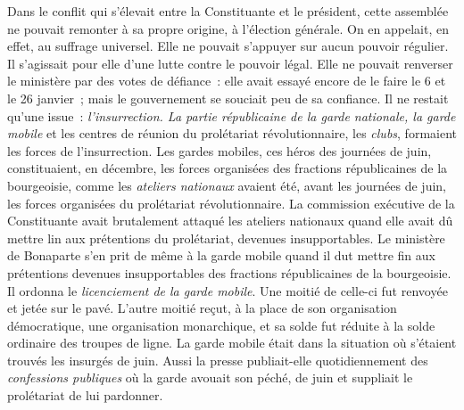 \documentclass[twoside]{book} %
\begin{document}
Dans le conflit qui s’élevait entre la Constituante et le président, cette assemblée ne pouvait remonter à sa propre origine, à l’élection générale. On en appelait, en effet, au suffrage universel. Elle ne pouvait s’appuyer sur aucun pouvoir régulier. Il s’agissait pour elle d’une lutte contre le pouvoir légal. Elle ne pouvait renverser le ministère par des votes de défiance : elle avait essayé encore de le faire le 6 et le 26 janvier ; mais le gouvernement se souciait peu de sa confiance. Il ne restait qu’une issue : \emph{l’insurrection. La partie républicaine de la garde nationale, la garde mobile} et les centres de réunion du prolétariat révolutionnaire, les \emph{clubs}, formaient les forces de l’insurrection. Les gardes mobiles, ces héros des journées de juin, constituaient, en décembre, les forces organisées des fractions républicaines de la bourgeoisie, comme les \emph{ateliers nationaux} avaient été, avant les journées de juin, les forces organisées du prolétariat révolutionnaire. La commission exécutive de la Constituante avait brutalement attaqué les ateliers nationaux quand elle avait dû mettre lin aux prétentions du prolétariat, devenues insupportables. Le ministère de Bonaparte s’en prit de même à la garde mobile quand il dut mettre fin aux prétentions devenues insupportables des fractions républicaines de la bourgeoisie. Il ordonna le \emph{licenciement de la garde mobile}. Une moitié de celle-ci fut renvoyée et jetée sur le pavé. L’autre moitié reçut, à la place de son organisation démocratique, une organisation monarchique, et sa solde fut réduite à la solde ordinaire des troupes de ligne. La garde mobile était dans la situation où s’étaient trouvés les insurgés de juin. Aussi la presse publiait-elle quotidiennement des \emph{confessions publiques} où la garde avouait son péché, de juin et suppliait le prolétariat de lui pardonner.\par
\end{document}
